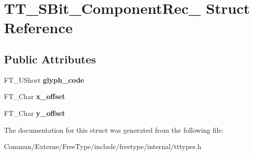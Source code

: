 \hypertarget{struct_t_t___s_bit___component_rec__}{}\section{T\+T\+\_\+\+S\+Bit\+\_\+\+Component\+Rec\+\_\+ Struct Reference}
\label{struct_t_t___s_bit___component_rec__}
\subsection*{Public Attributes}
\begin{DoxyCompactItemize}
\item 
F\+T\+\_\+\+U\+Short {\bfseries glyph\+\_\+code}\hypertarget{struct_t_t___s_bit___component_rec___a357eef9c05c65034b506cdd48271e562}{}\label{struct_t_t___s_bit___component_rec___a357eef9c05c65034b506cdd48271e562}

\item 
F\+T\+\_\+\+Char {\bfseries x\+\_\+offset}\hypertarget{struct_t_t___s_bit___component_rec___a97799704aa59bf737e274289fa70ca3f}{}\label{struct_t_t___s_bit___component_rec___a97799704aa59bf737e274289fa70ca3f}

\item 
F\+T\+\_\+\+Char {\bfseries y\+\_\+offset}\hypertarget{struct_t_t___s_bit___component_rec___af24f91b7d5e0268a223514ad68a9a10b}{}\label{struct_t_t___s_bit___component_rec___af24f91b7d5e0268a223514ad68a9a10b}

\end{DoxyCompactItemize}


The documentation for this struct was generated from the following file\+:\begin{DoxyCompactItemize}
\item 
Commun/\+Externe/\+Free\+Type/include/freetype/internal/tttypes.\+h\end{DoxyCompactItemize}
